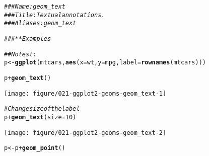 \documentclass[a4paper,titlepage]{tufte-handout}\usepackage[]{graphicx}\usepackage[]{color}
\makeatletter
\def\maxwidth{ %
  \ifdim\Gin@nat@width>\linewidth
    \linewidth
  \else
    \Gin@nat@width
  \fi
}
\newcommand{\hlnum}[1]{\textcolor[rgb]{0.686,0.059,0.569}{#1}}%
\newcommand{\hlcom}[1]{\textcolor[rgb]{0.678,0.584,0.686}{\textit{#1}}}%
\newcommand{\hlopt}[1]{\textcolor[rgb]{0,0,0}{#1}}%
\newcommand{\hlstd}[1]{\textcolor[rgb]{0.345,0.345,0.345}{#1}}%
\newcommand{\hlkwb}[1]{\textcolor[rgb]{0.69,0.353,0.396}{#1}}%
\newcommand{\hlkwc}[1]{\textcolor[rgb]{0.333,0.667,0.333}{#1}}%
\newcommand{\hlkwd}[1]{\textcolor[rgb]{0.737,0.353,0.396}{\textbf{#1}}}%
\newenvironment{kframe}{%
 \def\at@end@of@kframe{}%
 \ifinner\ifhmode%
  \def\at@end@of@kframe{\end{minipage}}%
  \begin{minipage}{\columnwidth}%
 \fi\fi%
 \def\FrameCommand##1{\hskip\@totalleftmargin \hskip-\fboxsep
 \colorbox{shadecolor}{##1}\hskip-\fboxsep
     \hskip-\linewidth \hskip-\@totalleftmargin \hskip\columnwidth}%
 \MakeFramed {\advance\hsize-\width
   \@totalleftmargin\z@ \linewidth\hsize
   \@setminipage}}%
 {\par\unskip\endMakeFramed%
 \at@end@of@kframe}
\newenvironment{knitrout}{}{} %
\makeatother
\begin{document}
\begin{knitrout}
\color{fgcolor}\begin{kframe}
\begin{alltt}
\hlcom{### Name: geom_text}
\hlcom{### Title: Textual annotations.}
\hlcom{### Aliases: geom_text}

\hlcom{### ** Examples}

\hlcom{## No test: }
\hlstd{p} \hlkwb{<-} \hlkwd{ggplot}\hlstd{(mtcars,} \hlkwd{aes}\hlstd{(}\hlkwc{x}\hlstd{=wt,} \hlkwc{y}\hlstd{=mpg,} \hlkwc{label}\hlstd{=}\hlkwd{rownames}\hlstd{(mtcars)))}

\hlstd{p} \hlopt{+} \hlkwd{geom_text}\hlstd{()}
\end{alltt}
\end{kframe}
\texttt{[image: figure/021-ggplot2-geoms-geom\_text-1]} 
\begin{kframe}\begin{alltt}
\hlcom{# Change size of the label}
\hlstd{p} \hlopt{+} \hlkwd{geom_text}\hlstd{(}\hlkwc{size}\hlstd{=}\hlnum{10}\hlstd{)}
\end{alltt}
\end{kframe}
\texttt{[image: figure/021-ggplot2-geoms-geom\_text-2]} 
\begin{kframe}\begin{alltt}
\hlstd{p} \hlkwb{<-} \hlstd{p} \hlopt{+} \hlkwd{geom_point}\hlstd{()}


\end{alltt}
\end{kframe}
\end{knitrout}
\end{document}
